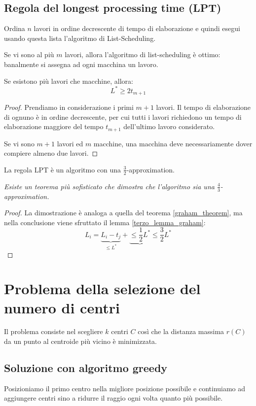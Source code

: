 \documentclass[\main/main.tex]{subfiles}
\begin{document}
\subsection{Regola del longest processing time (LPT)}
Ordina \(n\) lavori in ordine decrescente di tempo di elaborazione e quindi esegui usando questa lista l'algoritmo di List-Scheduling.

\begin{observation}
	Se vi sono al più \(m\) lavori, allora l'algoritmo di list-scheduling è ottimo: banalmente si assegna ad ogni macchina un lavoro.
\end{observation}

\begin{lemma}
	Se esistono più lavori che macchine, allora:
	\[
		L^* \geq 2t_{m+1}
	\]
	\label{terzo_lemma_graham}
\end{lemma}
\begin{proof}
	Prendiamo in considerazione i primi \(m+1\) lavori. Il tempo di elaborazione di ognuno è in ordine decrescente, per cui tutti i lavori richiedono un tempo di elaborazione maggiore del tempo \(t_{m+1}\) dell'ultimo lavoro considerato.

	Se vi sono \(m+1\) lavori ed \(m\) macchine, una macchina deve necessariamente dover compiere almeno due lavori.
\end{proof}

\begin{theorem}
	La regola LPT è un algoritmo con una \(\frac{3}{2}\)-approximation.

	\textit{Esiste un teorema più sofisticato che dimostra che l'algoritmo sia una \(\frac{4}{3}\)-approximation.}
\end{theorem}
\begin{proof}
	La dimostrazione è analoga a quella del teorema \ref{graham_theorem}, ma nella conclusione viene sfruttato il lemma \ref{terzo_lemma_graham}:
	\[
		L_i = \underbrace{L_i - t_j}_{\leq L^*} + \underbrace{\leq \frac{1}{2}L^*} \leq \frac{3}{2} L^*
	\]
\end{proof}

\section{Problema della selezione del numero di centri}
Il problema consiste nel scegliere \(k\) centri \(C\) così che la distanza massima \(r(C)\) da un punto al centroide più vicino è minimizzata.

\subsection{Soluzione con algoritmo greedy}
Posizioniamo il primo centro nella migliore posizione possibile e continuiamo ad aggiungere centri sino a ridurre il raggio ogni volta quanto più possibile.
\end{document}
